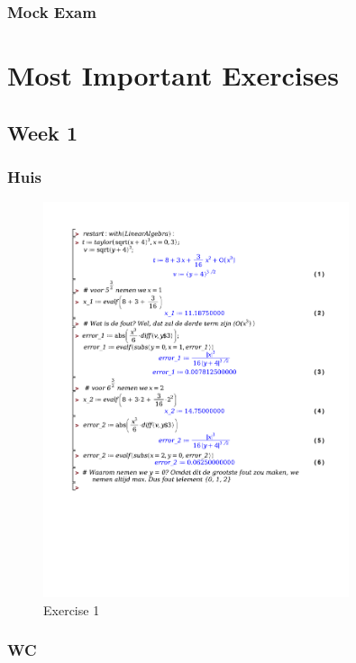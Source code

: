 \documentclass[a4paper]{report}
\begin{document}
\subsection*{Mock Exam}



\chapter{Most Important Exercises}

\section{Week 1}

\subsection{Huis}

\begin{figure}[H]
	\centering
	\includegraphics[width=0.8\textwidth]{./exercises/huis_1_ex_1.pdf}
	\caption{Exercise 1}
\end{figure}

\subsection{WC}
\end{document}
